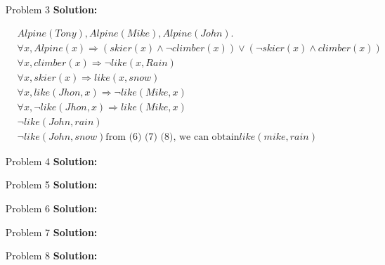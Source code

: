 \normalfont\documentclass[letterpaper,11pt]{article}
\begin{document}
\begin{enumerate}
\begin{enumerate}
	\end{enumerate}
\item[Problem 3]\textbf{Solution:}\par
	\begin{align}
		&Alpine(Tony), Alpine(Mike), Alpine(John).\\
		&\forall x, Alpine(x)  \Rightarrow (skier(x)\land \neg climber(x)) \lor (\neg skier(x) \land climber(x))\\
		&\forall x, climber(x) \Rightarrow \neg like(x,Rain) \\
		&\forall x, skier(x) \Rightarrow like(x,snow) \\
		&\forall x, like(Jhon, x) \Rightarrow \neg like(Mike, x)\\
		&\forall x, \neg like(Jhon, x) \Rightarrow like(Mike, x)\\
		&\neg like(John, rain)\\
		&\neg like(John, snow)
		\text{from (6) (7) (8), we can obtain}
		like(mike,rain)
	\end{align}
\item[Problem 4]\textbf{Solution:}\par
\item[Problem 5]\textbf{Solution:}\par
\item[Problem 6]\textbf{Solution:}\par
\item[Problem 7]\textbf{Solution:}\par
\item[Problem 8]\textbf{Solution:}\par
\end{enumerate}
\end{document}
